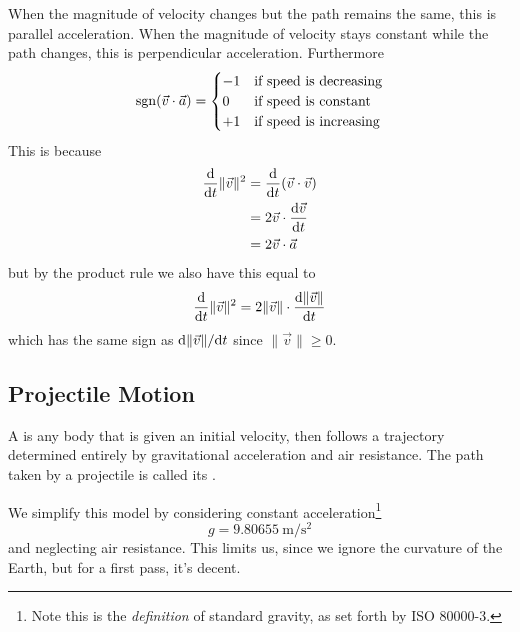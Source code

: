 When the magnitude of velocity changes but the path remains the same,
this is parallel acceleration. When the magnitude of velocity stays
constant while the path changes, this is perpendicular
acceleration. Furthermore
\begin{equation}
\operatorname{sgn}(\vec{v}\cdot\vec{a})=\begin{cases}
-1 & \mbox{if speed is decreasing}\\
0 & \mbox{if speed is constant}\\
+1 & \mbox{if speed is increasing}
\end{cases}
\end{equation}
This is because
\begin{equation}
\begin{split}
\frac{\mathrm{d}}{\mathrm{d} t}\|\vec{v}\|^{2}
&=\frac{\mathrm{d}}{\mathrm{d} t}(\vec{v}\cdot\vec{v})\\
&=2\vec{v}\cdot\frac{\mathrm{d}\vec{v}}{\mathrm{d} t}\\
&=2\vec{v}\cdot\vec{a}
\end{split}
\end{equation}
but by the product rule we also have this equal to
\begin{equation}
\frac{\mathrm{d}}{\mathrm{d} t}\|\vec{v}\|^{2}=2\|\vec{v}\|\cdot\frac{\mathrm{d}\|\vec{v}\|}{\mathrm{d} t}
\end{equation}
which has the same sign as $\mathrm{d}\|\vec{v}\|/\mathrm{d} t$ since
$\|\vec{v}\|\geq0$. 

\subsection{Projectile Motion}
A  is any body that is given an initial velocity,
then follows a trajectory determined entirely by gravitational
acceleration and air resistance. The path taken by a projectile is
called its .

\begin{rmk}
We simplify this model by considering constant
acceleration\footnote{Note this is the \emph{definition} of standard
  gravity, as set forth by ISO 80000-3.}
\begin{equation}
g=\SI{9.80655}{\meter/\square\second} 
\end{equation}
and neglecting air resistance. This limits us, since we ignore the
curvature of the Earth, but for a first pass, it's decent.
\end{rmk}


